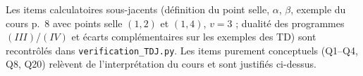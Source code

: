 \documentclass[11pt,a4paper]{article}
\begin{document}
\begin{verifbox}
Les items calculatoires sous-jacents (définition du point selle, $\alpha$, $\beta$, exemple du cours p.~8 avec points selle $(1,2)$ et $(1,4)$, $v=3$ ; dualité des programmes $(III)$/$(IV)$ et écarts complémentaires sur les exemples des TD) sont recontrôlés dans \texttt{verification\_TDJ.py}. Les items purement conceptuels (Q1--Q4, Q8, Q20) relèvent de l'interprétation du cours et sont justifiés ci-dessus.
\end{verifbox}
\end{document}
